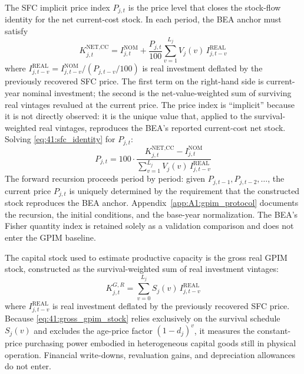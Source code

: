 The SFC implicit price index $P_{j,t}$ is the price level that
closes the stock-flow identity for the net current-cost stock. In
each period, the BEA anchor must satisfy
\begin{equation}
	K^{\text{NET,CC}}_{j,t}
	= I^{\text{NOM}}_{j,t}
	+ \frac{P_{j,t}}{100}
	\sum_{v=1}^{L_j} V_j(v)\, I^{\text{REAL}}_{j,t-v}
	\label{eq:41:sfc_identity}
\end{equation}
where $I^{\text{REAL}}_{j,t-v} = I^{\text{NOM}}_{j,t-v}/(P_{j,t-v}/100)$
is real investment deflated by the previously recovered SFC price.
The first term on the right-hand side is current-year nominal
investment; the second is the net-value-weighted sum of surviving
real vintages revalued at the current price. The price index is
``implicit'' because it is not directly observed: it is the unique
value that, applied to the survival-weighted real vintages,
reproduces the BEA's reported current-cost net stock. Solving
\eqref{eq:41:sfc_identity} for $P_{j,t}$:
\begin{equation}
	P_{j,t} = 100 \cdot
	\frac{K^{\text{NET,CC}}_{j,t} - I^{\text{NOM}}_{j,t}}
	{\displaystyle\sum_{v=1}^{L_j} V_j(v)\, I^{\text{REAL}}_{j,t-v}}
	\label{eq:41:sfc_price_recursion}
\end{equation}
The forward recursion proceeds period by period: given
$P_{j,t-1}, P_{j,t-2}, \ldots$, the current price $P_{j,t}$ is
uniquely determined by the requirement that the constructed stock
reproduces the BEA anchor.
Appendix~\ref{app:A1:gpim_protocol} documents the recursion, the
initial conditions, and the base-year normalization. The BEA's Fisher
quantity index is retained solely as a validation comparison and does
not enter the GPIM baseline.

The capital stock used to estimate productive capacity is the gross
real GPIM stock, constructed as the survival-weighted sum of real
investment vintages:
\begin{equation}
	K^{G,R}_{j,t} = \sum_{v=0}^{L_j} S_j(v)\,
	I^{\text{REAL}}_{j,t-v}
	\label{eq:41:gross_gpim_stock}
\end{equation}
where $I^{\text{REAL}}_{j,t-v}$ is real investment deflated by the
previously recovered SFC price. Because
\cref{eq:41:gross_gpim_stock} relies exclusively on the survival
schedule $S_j(v)$ and excludes the age-price factor $(1-d_j)^v$, it
measures the constant-price purchasing power embodied in
heterogeneous capital goods still in physical operation. Financial
write-downs, revaluation gains, and depreciation allowances do not
enter.

